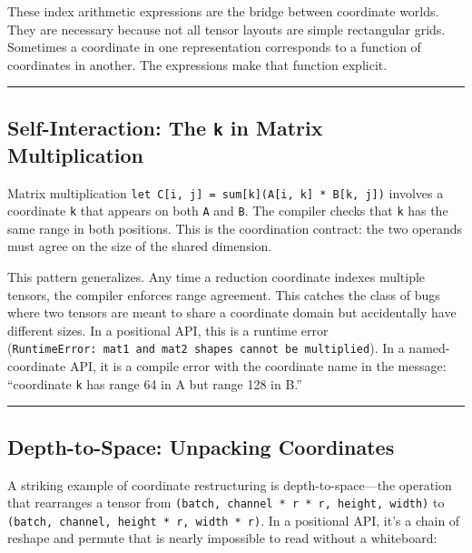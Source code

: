 \documentclass[11pt,]{article}
\begin{document}
These index arithmetic expressions are the bridge between coordinate
worlds. They are necessary because not all tensor layouts are simple
rectangular grids. Sometimes a coordinate in one representation
corresponds to a function of coordinates in another. The expressions
make that function explicit.

\begin{center}\rule{0.5\linewidth}{0.4pt}\end{center}

\hypertarget{self-interaction-the-k-in-matrix-multiplication}{%
\subsection{\texorpdfstring{Self-Interaction: The \texttt{k} in Matrix
Multiplication}{Self-Interaction: The k in Matrix Multiplication}}\label{self-interaction-the-k-in-matrix-multiplication}}

Matrix multiplication
\texttt{let\ C{[}i,\ j{]}\ =\ sum{[}k{]}(A{[}i,\ k{]}\ *\ B{[}k,\ j{]})}
involves a coordinate \texttt{k} that appears on both \texttt{A} and
\texttt{B}. The compiler checks that \texttt{k} has the same range in
both positions. This is the coordination contract: the two operands must
agree on the size of the shared dimension.

This pattern generalizes. Any time a reduction coordinate indexes
multiple tensors, the compiler enforces range agreement. This catches
the class of bugs where two tensors are meant to share a coordinate
domain but accidentally have different sizes. In a positional API, this
is a runtime error
(\texttt{RuntimeError:\ mat1\ and\ mat2\ shapes\ cannot\ be\ multiplied}).
In a named-coordinate API, it is a compile error with the coordinate
name in the message: ``coordinate \texttt{k} has range 64 in A but range
128 in B.''

\begin{center}\rule{0.5\linewidth}{0.4pt}\end{center}

\hypertarget{depth-to-space-unpacking-coordinates}{%
\subsection{Depth-to-Space: Unpacking
Coordinates}\label{depth-to-space-unpacking-coordinates}}

A striking example of coordinate restructuring is depth-to-space---the
operation that rearranges a tensor from
\texttt{(batch,\ channel\ *\ r\ *\ r,\ height,\ width)} to
\texttt{(batch,\ channel,\ height\ *\ r,\ width\ *\ r)}. In a positional
API, it's a chain of reshape and permute that is nearly impossible to
read without a whiteboard:
\end{document}
